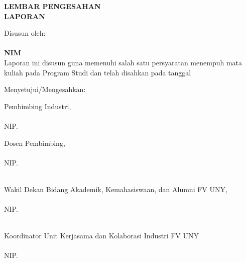 
\newpage
{}
\begin{center}
    \begin{doublespace}
        \textbf{\large \MakeUppercase{lembar pengesahan}}\\
        \textbf{\large \MakeUppercase{Laporan {\tipe}}}
    \end{doublespace}
\end{center}

\begin{center}
    \begin{doublespace}
        \textbf{\large \MakeUppercase {\judulid}}
    \end{doublespace}
\end{center}

\begin{center}
    Disusun oleh:\\
    \textbf{\penulis}\\
    \textbf{NIM \nim}\\[1.5cm]

    Laporan ini disusun guna memenuhi salah satu persyaratan menempuh mata kuliah {\tipe} pada Program Studi {\prodi} {\fakultas} {\universitas} dan telah disahkan pada tanggal \tglpengesahan\\[0.75cm]
\end{center}

\begin{center}
    Menyetujui/Mengesahkan:\\
\end{center}

\begin{minipage}{0.35\textwidth}
    Pembimbing Industri,\\[2cm]
    \pembimbingindustri\\
    NIP. \NIKpembimbingindustri
\end{minipage}
\hfill
\begin{minipage}{0.47\textwidth}
    Dosen Pembimbing,\\[2cm]
    \pembimbing\\
    NIP. \NIPpembimbing
\end{minipage}%

\begin{minipage}{0.35\textwidth}
    \hfill\\[2em]
    Wakil Dekan Bidang Akademik, Kemahasiswaan, dan Alumni FV UNY,\\[2cm]
    \wakildekan\\
    NIP. \NIPwakildekan
\end{minipage}
\hfill
\begin{minipage}{0.47\textwidth}
    \hfill\\[2em]
    Koordinator Unit Kerjasama dan Kolaborasi Industri {\prodi} FV UNY\\[2cm]
    \koordinatorUKKI\\
    NIP. \NIPkoordinatorUKKI
\end{minipage}%

